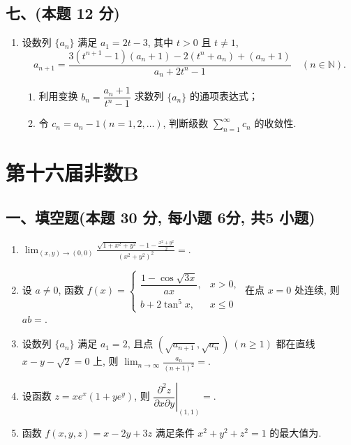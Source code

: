 \subsection*{七、(本题 12 分)}
\begin{enumerate}[start=11]
    \item 设数列 $\{a_n\}$ 满足 $a_1 = 2t - 3$, 其中 $t > 0$ 且 $t \neq 1$,
          \[a_{n+1} = \frac{3(t^{n+1} - 1)(a_n + 1) - 2(t^n + a_n) + (a_n + 1)}{a_n + 2t^n - 1} \quad (n \in \mathbb{N}).\]
          \begin{enumerate}
              \item[(1)] 利用变换 $b_n = \dfrac{a_n + 1}{t^n - 1}$ 求数列 $\{a_n\}$ 的通项表达式；
              \item[(2)] 令 $c_n = a_n - 1 (n = 1, 2, \ldots)$, 判断级数 $\displaystyle\sum_{n=1}^{\infty} c_n$ 的收敛性.
          \end{enumerate}
\end{enumerate}


\newpage
\section{第十六届非数B}

\subsection*{一、填空题(本题 30 分,  每小题 6分,  共5 小题)}
\begin{enumerate}
    \item $\displaystyle\lim_{(x,y) \to (0,0)} \frac{\sqrt{1 + x^2 + y^2} - 1 - \frac{x^2 + y^2}{2}}{(x^2 + y^2)^2} = $\underline{\quad \quad}.
    \item 设 $a \neq 0$, 函数
          $f(x) = \begin{cases}
                  \dfrac{1 - \cos \sqrt{3x}}{a x}, & x > 0,   \\[8pt]
                  b + 2 \tan^5 x,                  & x \leq 0
              \end{cases}$
          在点 $x = 0$ 处连续, 则 $ab =$\underline{\quad \quad}.
    \item 设数列 $\{a_n\}$ 满足 $a_1 = 2$, 且点 $(\sqrt{a_{n+1}}, \sqrt{a_n}) \ (n \geq 1)$ 都在直线 $x - y - \sqrt{2} = 0$ 上, 则 $\displaystyle\lim_{n \to \infty} \frac{a_n}{(n + 1)^2} =$\underline{\quad \quad}.
    \item 设函数 $z = x e^x (1 + y e^y)$, 则 $\left. \dfrac{\partial^2 z}{\partial x \partial y} \right|_{(1,1)} =$\underline{\quad \quad}.
    \item 函数 $f(x, y, z) = x - 2y + 3z$ 满足条件 $x^2 + y^2 + z^2 = 1$ 的最大值为\underline{\quad \quad}.
\end{enumerate}

